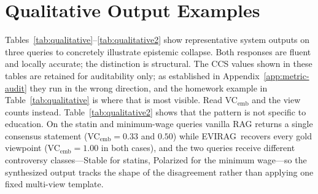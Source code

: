 \documentclass[11pt]{article}
\newcommand{\system}{\textsc{EVIRAG}\xspace}
\begin{document}

\section{Qualitative Output Examples}
\label{app:examples}

Tables~\ref{tab:qualitative}--\ref{tab:qualitative2} show representative
system outputs on three queries to concretely illustrate epistemic collapse.
Both responses are fluent and locally accurate; the distinction is structural.
The CCS values shown in these tables are retained for auditability only; as
established in Appendix~\ref{app:metric-audit} they run in the wrong direction,
and the homework example in Table~\ref{tab:qualitative} is where that is most
visible.  Read VC$_\text{emb}$ and the view counts instead.
Table~\ref{tab:qualitative2} shows that the pattern is not specific to
education.  On the statin and minimum-wage queries vanilla RAG returns a single
consensus statement (VC$_\text{emb}{=}0.33$ and $0.50$) while \system\ recovers
every gold viewpoint (VC$_\text{emb}{=}1.00$ in both cases), and the two
queries receive different controversy classes---Stable for statins, Polarized
for the minimum wage---so the synthesized output tracks the shape of the
disagreement rather than applying one fixed multi-view template.
\end{document}
